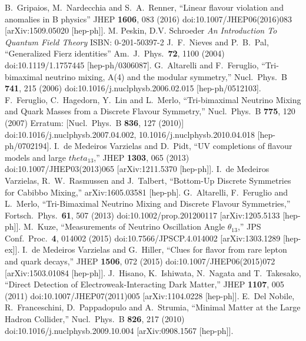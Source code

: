 \begin{thebibliography}{xxx}
  B.~Gripaios, M.~Nardecchia and S.~A.~Renner,
  ``Linear flavour violation and anomalies in B physics''
  JHEP {\bf 1606}, 083 (2016)
  doi:10.1007/JHEP06(2016)083
  [arXiv:1509.05020 [hep-ph]].
M. Peskin, D.V. Schroeder \textit{An Introduction To Quantum Field Theory} ISBN: 0-201-50397-2
  J.~F.~Nieves and P.~B.~Pal, 
  ``Generalized Fierz identities''
  Am.\ J.\ Phys.\  {\bf 72}, 1100 (2004)
  doi:10.1119/1.1757445
  [hep-ph/0306087].
    G.~Altarelli and F.~Feruglio,
  ``Tri-bimaximal neutrino mixing, A(4) and the modular symmetry,''
  Nucl.\ Phys.\ B {\bf 741}, 215 (2006)
  doi:10.1016/j.nuclphysb.2006.02.015
  [hep-ph/0512103].
    F.~Feruglio, C.~Hagedorn, Y.~Lin and L.~Merlo,
  ``Tri-bimaximal Neutrino Mixing and Quark Masses from a Discrete Flavour Symmetry,''
  Nucl.\ Phys.\ B {\bf 775}, 120 (2007)
  Erratum: [Nucl.\ Phys.\ B {\bf 836}, 127 (2010)]
  doi:10.1016/j.nuclphysb.2007.04.002, 10.1016/j.nuclphysb.2010.04.018
  [hep-ph/0702194].
    I.~de Medeiros Varzielas and D.~Pidt,
  ``UV completions of flavour models and large $theta_{13}$,''
  JHEP {\bf 1303}, 065 (2013)
  doi:10.1007/JHEP03(2013)065
  [arXiv:1211.5370 [hep-ph]].
    I.~de Medeiros Varzielas, R.~W.~Rasmussen and J.~Talbert,
  ``Bottom-Up Discrete Symmetries for Cabibbo Mixing,''
  arXiv:1605.03581 [hep-ph].
  G.~Altarelli, F.~Feruglio and L.~Merlo,
  ``Tri-Bimaximal Neutrino Mixing and Discrete Flavour Symmetries,''
  Fortsch.\ Phys.\  {\bf 61}, 507 (2013)
  doi:10.1002/prop.201200117
  [arXiv:1205.5133 [hep-ph]].
    M.~Kuze,
  ``Measurements of Neutrino Oscillation Angle $\theta_{13}$,''
  JPS Conf.\ Proc.\  {\bf 4}, 014002 (2015)
  doi:10.7566/JPSCP.4.014002
  [arXiv:1303.1289 [hep-ex]].
  I.~de Medeiros Varzielas and G.~Hiller,
  ``Clues for flavor from rare lepton and quark decays,''
  JHEP {\bf 1506}, 072 (2015)
  doi:10.1007/JHEP06(2015)072
  [arXiv:1503.01084 [hep-ph]].
 J.~Hisano, K.~Ishiwata, N.~Nagata and T.~Takesako,
  ``Direct Detection of Electroweak-Interacting Dark Matter,''
  JHEP {\bf 1107}, 005 (2011)
  doi:10.1007/JHEP07(2011)005
  [arXiv:1104.0228 [hep-ph]].
  E.~Del Nobile, R.~Franceschini, D.~Pappadopulo and A.~Strumia,
  ``Minimal Matter at the Large Hadron Collider,''
  Nucl.\ Phys.\ B {\bf 826}, 217 (2010)
  doi:10.1016/j.nuclphysb.2009.10.004
  [arXiv:0908.1567 [hep-ph]].

\end{thebibliography}
